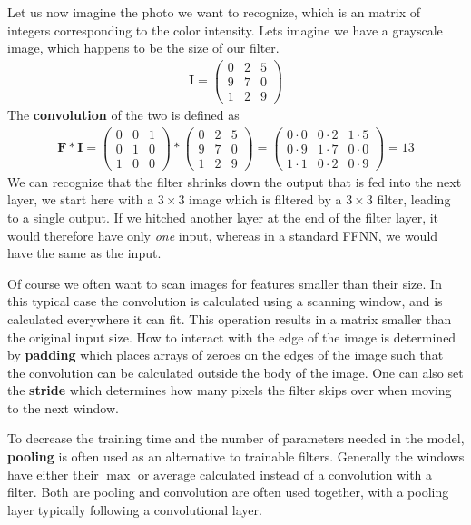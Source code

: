 Let us now imagine the photo we want to recognize, which is an matrix of integers corresponding to the color intensity. Lets imagine we have a grayscale image, which happens to be the size of our filter.
\begin{align}
    \textbf{I} = 
\begin{pmatrix}
0 & 2 & 5 \\
9 & 7 & 0 \\
1 & 2 & 9
\end{pmatrix}
\end{align}
The \textbf{convolution} of the two is defined as
\begin{align}
\textbf{F} * \textbf{I} = 
\begin{pmatrix}
0 & 0 & 1 \\
0 & 1 & 0 \\
1 & 0 & 0
\end{pmatrix}
*
    \begin{pmatrix}
0 & 2 & 5 \\
9 & 7 & 0 \\
1 & 2 & 9
\end{pmatrix}
=     
\begin{pmatrix}
0\cdot 0 & 0\cdot2 & 1\cdot 5 \\
0\cdot 9 & 1\cdot 7 & 0\cdot 0 \\
1\cdot 1 & 0\cdot 2 & 0 \cdot 9
\end{pmatrix} = 13
\end{align}
We can recognize that the filter shrinks down the output that is fed into the next layer, we start here with a $3\times 3$ image which is filtered by a $3\times 3$ filter, leading to a single output. If we hitched another layer at the end of the filter layer, it would therefore have only \emph{one} input, whereas in a standard FFNN, we would have the same as the input.

Of course we often want to scan images for features smaller than their size. In this typical case the convolution is calculated using a scanning window, and is calculated everywhere it can fit. This operation results in a matrix smaller than the original input size. How to interact with the edge of the image is determined by \textbf{padding} which places arrays of zeroes on the edges of the image such that the convolution can be calculated outside the body of the image. One can also set the \textbf{stride} which determines how many pixels the filter skips over when moving to the next window.

To decrease the training time and the number of parameters needed in the model, \textbf{pooling} is often used as an alternative to trainable filters. Generally the windows have either their $\max$ or $\textrm{average}$ calculated instead of a convolution with a filter. Both are pooling and convolution are often used together, with a pooling layer typically following a convolutional layer.


